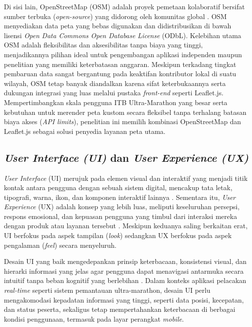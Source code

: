Di sisi lain, OpenStreetMap (OSM) adalah proyek pemetaan kolaboratif bersifat sumber terbuka (\textit{open-source}) yang didorong oleh komunitas global \cite{haklay2008openstreetmap}. OSM menyediakan data peta yang bebas digunakan dan didistribusikan di bawah lisensi \textit{Open Data Commons Open Database License} (ODbL). Kelebihan utama OSM adalah fleksibilitas dan aksesibilitas tanpa biaya yang tinggi, menjadikannya pilihan ideal untuk pengembangan aplikasi independen maupun penelitian yang memiliki keterbatasan anggaran. Meskipun terkadang tingkat pembaruan data sangat bergantung pada keaktifan kontributor lokal di suatu wilayah, OSM tetap banyak diandalkan karena sifat keterbukaannya serta dukungan integrasi yang luas melalui pustaka \textit{front-end} seperti Leaflet.js. Mempertimbangkan skala pengguna ITB Ultra-Marathon yang besar serta kebutuhan untuk merender peta kustom secara fleksibel tanpa terhalang batasan biaya akses (\textit{API limits}), penelitian ini memilih kombinasi OpenStreetMap dan Leaflet.js sebagai solusi penyedia layanan peta utama.

\subsection{\textit{User Interface (UI)} dan \textit{User Experience (UX)}}
\textit{User Interface} (UI) merujuk pada elemen visual dan interaktif yang menjadi titik kontak antara pengguna dengan sebuah sistem digital, mencakup tata letak, tipografi, warna, ikon, dan komponen interaktif lainnya \cite{galitz2007essential}. Sementara itu, \textit{User Experience} (UX) adalah konsep yang lebih luas, meliputi keseluruhan persepsi, respons emosional, dan kepuasan pengguna yang timbul dari interaksi mereka dengan produk atau layanan tersebut \cite{maguire2001methods}. Meskipun keduanya saling berkaitan erat, UI berfokus pada aspek tampilan (\textit{look}) sedangkan UX berfokus pada aspek pengalaman (\textit{feel}) secara menyeluruh.

Desain UI yang baik mengedepankan prinsip keterbacaan, konsistensi visual, dan hierarki informasi yang jelas agar pengguna dapat menavigasi antarmuka secara intuitif tanpa beban kognitif yang berlebihan \cite{nielsen1994usability}. Dalam konteks aplikasi pelacakan \textit{real-time} seperti sistem pemantauan ultra-marathon, desain UI perlu mengakomodasi kepadatan informasi yang tinggi, seperti data posisi, kecepatan, dan status peserta, sekaligus tetap mempertahankan keterbacaan di berbagai kondisi penggunaan, termasuk pada layar perangkat \textit{mobile}.

